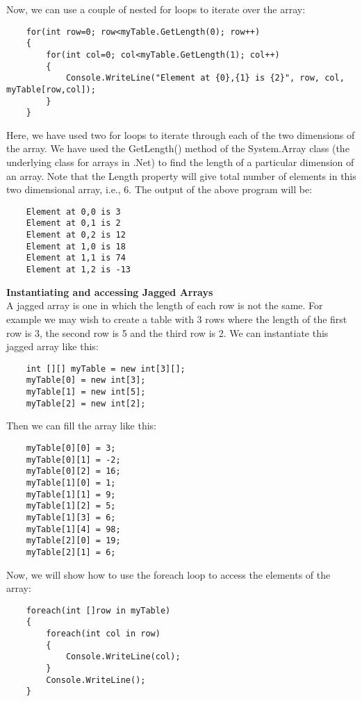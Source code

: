 Now, we can use a couple of nested for loops to iterate over the array:

\begin{lstlisting}
    for(int row=0; row<myTable.GetLength(0); row++)
    {
        for(int col=0; col<myTable.GetLength(1); col++)
        {
            Console.WriteLine("Element at {0},{1} is {2}", row, col, myTable[row,col]);
        }
    }        
\end{lstlisting}

Here, we have used two for loops to iterate through each of the two dimensions of the array. We have used the
GetLength() method of the System.Array class (the underlying class for arrays in .Net) to find the length of a
particular dimension of an array. Note that the Length property will give total number of elements in this two
dimensional array, i.e., 6. The output of the above program will be:

\begin{lstlisting}
    Element at 0,0 is 3
    Element at 0,1 is 2
    Element at 0,2 is 12
    Element at 1,0 is 18
    Element at 1,1 is 74
    Element at 1,2 is -13        
\end{lstlisting}

\textbf{Instantiating and accessing Jagged Arrays}\\

A jagged array is one in which the length of each row is not the same. For example we may wish to create a table
with 3 rows where the length of the first row is 3, the second row is 5 and the third row is 2. We can instantiate this
jagged array like this:


\begin{lstlisting}
    int [][] myTable = new int[3][];
    myTable[0] = new int[3];
    myTable[1] = new int[5];
    myTable[2] = new int[2];        
\end{lstlisting}

Then we can fill the array like this:

\begin{lstlisting}
    myTable[0][0] = 3;
    myTable[0][1] = -2;
    myTable[0][2] = 16;
    myTable[1][0] = 1;
    myTable[1][1] = 9;
    myTable[1][2] = 5;
    myTable[1][3] = 6;
    myTable[1][4] = 98;
    myTable[2][0] = 19;
    myTable[2][1] = 6;        
\end{lstlisting}

Now, we will show how to use the foreach loop to access the elements of the array:

\begin{lstlisting}
    foreach(int []row in myTable)
    {
        foreach(int col in row)
        {
            Console.WriteLine(col);
        }
        Console.WriteLine();
    }        
\end{lstlisting}

